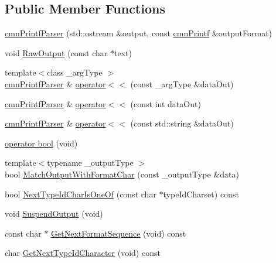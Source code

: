 \subsection*{Public Member Functions}
\begin{DoxyCompactItemize}
\item 
\hyperlink{classcmn_printf_parser_ac1b7a21e87f67c2794d96b6396684605}{cmn\+Printf\+Parser} (std\+::ostream \&output, const \hyperlink{classcmn_printf}{cmn\+Printf} \&output\+Format)
\item 
void \hyperlink{classcmn_printf_parser_ae00c0714e7d6a40d948adea3f853831a}{Raw\+Output} (const char $\ast$text)
\item 
{\footnotesize template$<$class \+\_\+arg\+Type $>$ }\\\hyperlink{classcmn_printf_parser}{cmn\+Printf\+Parser} \& \hyperlink{classcmn_printf_parser_ac71563adac7e161bcdfd2818fd1d5223}{operator$<$$<$} (const \+\_\+arg\+Type \&data\+Out)
\item 
\hyperlink{classcmn_printf_parser}{cmn\+Printf\+Parser} \& \hyperlink{classcmn_printf_parser_a09d2d6905e95ed2be82b6818bf33bdf7}{operator$<$$<$} (const int data\+Out)
\item 
\hyperlink{classcmn_printf_parser}{cmn\+Printf\+Parser} \& \hyperlink{classcmn_printf_parser_a89b9cf7fb07f9515f36afc8d4615f51d}{operator$<$$<$} (const std\+::string \&data\+Out)
\item 
\hyperlink{classcmn_printf_parser_a5658260befa307892d4d0f5a8d64ede2}{operator bool} (void)
\item 
{\footnotesize template$<$typename \+\_\+output\+Type $>$ }\\bool \hyperlink{classcmn_printf_parser_a9f49769b75aac6b4ca6043d5f8f8067b}{Match\+Output\+With\+Format\+Char} (const \+\_\+output\+Type \&data)
\item 
bool \hyperlink{classcmn_printf_parser_a221dc91e102dcdb2f8cbd52054a4ab90}{Next\+Type\+Id\+Char\+Is\+One\+Of} (const char $\ast$type\+Id\+Charset) const 
\item 
void \hyperlink{classcmn_printf_parser_a0c353c4744a66855b1e276a21da5e46f}{Suspend\+Output} (void)
\item 
const char $\ast$ \hyperlink{classcmn_printf_parser_a2908968461a5524557ec1edbc08d244e}{Get\+Next\+Format\+Sequence} (void) const 
\item 
char \hyperlink{classcmn_printf_parser_aa27ed28b25589a5fd2d8719c2510f265}{Get\+Next\+Type\+Id\+Character} (void) const 
\end{DoxyCompactItemize}
